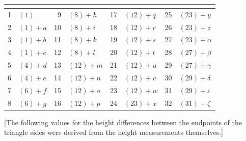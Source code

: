 {\centering
\setlength{\tabcolsep}{.57em}
\begin{tabular}{|r|l||r|l||r|l||r|l|}
&
&
&
&
&
&
&
\\[3pt]
 & \((1)\) & 9 & \((8)+h\) & 17 & \((12)+q\) & 25 & \((23)+y\)\\
2 & \((1)+a\) & 10 & \((8)+i\) & 18 & \((12)+r\) & 26 & \((23)+z\)\\
3 & \((1)+b\) & 11 & \((8)+k\) & 19 & \((12)+s\) & 27 & \((23)+\alpha\)\\
4 & \((1)+c\) & 12 & \((8)+l\) & 20 & \((12)+t\) & 28 & \((27)+\beta\)\\
5 & \((4)+d\) & 13 & \((12)+m\) & 21 & \((12)+u\) & 29 & \((27)+\gamma\)\\
6 & \((4)+e\) & 14 & \((12)+n\) & 22 & \((12)+v\) & 30 & \((29)+\delta\)\\
7 & \((6)+f\) & 15 & \((12)+o\) & 23 & \((12)+w\) & 31 & \((29)+\varepsilon\)\\
8 & \((6)+g\) & 16 & \((12)+p\) & 24 & \((23)+x\) & 32 & \((31)+\zeta\)\\
\end{tabular}\par}

\par\medskip
\par\noindent\hspace*{\parindent}[The following values for the height differences between the endpoints
of the triangle sides were derived from the height measurements themselves.]


